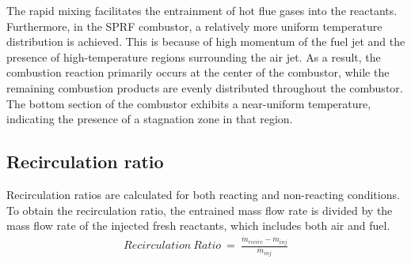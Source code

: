 The rapid mixing facilitates the entrainment of hot flue gases into the reactants. Furthermore, in the SPRF combustor, a relatively more uniform temperature distribution is achieved. This is because of high momentum of the fuel jet and the presence of high-temperature regions surrounding the air jet. As a result, the combustion reaction primarily occurs at the center of the combustor, while the remaining combustion products are evenly distributed throughout the combustor. The bottom section of the combustor exhibits a near-uniform temperature, indicating the presence of a stagnation zone in that region.

\subsection{Recirculation ratio }

Recirculation ratios are calculated for both reacting and non-reacting conditions. To obtain the recirculation ratio, the entrained mass flow rate is divided by the mass flow rate of the injected fresh reactants, which includes both air and fuel.
\begin{align}
 Recirculation \ Ratio \ = \ \frac{\dot m_{recirc} - \dot m_{inj}}{\dot m_{inj}}
\end{align}
